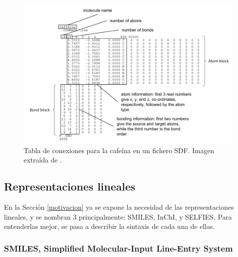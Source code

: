 \begin{figure}[h!]
    \centering
    \includegraphics[scale=0.5]{imagenes/estado_arte/teoria/conection_table.png}
    \caption{Tabla de conexiones para la cafeína en un fichero SDF. Imagen extraída de \cite{brown_chemoinformaticsintroduction_2009}.}
    \label{fig:conection_table}
\end{figure}

\subsection{Representaciones lineales} \label{teoria:representaciones_lineales}
En la Sección \ref{motivacion} ya se expone la necesidad de las representaciones lineales, y se nombran 3 principalmente: SMILES, InChI, y SELFIES. Para entenderlas mejor, se pasa a describir la sintaxis de cada una de ellas.

\subsubsection{SMILES, Simplified Molecular-Input Line-Entry System}

